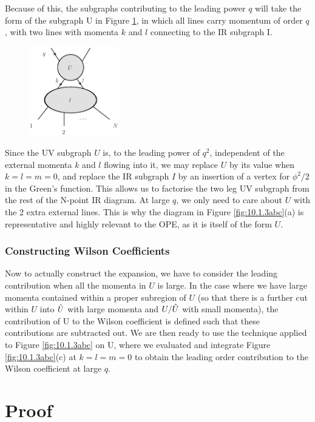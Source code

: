 \documentclass{article}
\begin{document}
Because of this, the subgraphs contributing to the leading power $q$ will take the form of the subgraph U in Figure \ref{fig:10.2.1}, in which all lines carry momentum of order $q$, with two lines with momenta $k$ and $l$ connecting to the IR subgraph I. 

\begin{figure}[H]
\centering
\includegraphics[width=0.35\textwidth]{Graphs/fig1021.eps} 
\caption{}
\label{fig:10.2.1}
\end{figure}

Since the UV subgraph $U$ is, to the leading power of $q^2$, independent of the external momenta $k$ and $l$ flowing into it, we may replace $U$ by its value when $k=l=m=0$, and replace the IR subgraph $I$ by an insertion of a vertex for $\phi^2/2$ in the Green's function. This allows us to factorise the two leg UV subgraph from the rest of the N-point IR diagram. At large $q$, we only need to care about $U$ with the 2 extra external lines. This is why the diagram in Figure \ref{fig:10.1.3abc}(a) is representative and highly relevant to the OPE, as it is itself of the form $U$.

\subsubsection{Constructing Wilson Coefficients}
Now to actually construct the expansion, we have to consider the leading contribution when all the momenta in $U$ is large. In the case where we have large momenta contained within a proper subregion of $U$ (so that there is a further cut within $U$ into $\Hat{U}$ with large momenta and $U/\Hat{U}$ with small momenta), the contribution of U to the Wilson coefficient is defined such that these contributions are subtracted out. We are then ready to use the technique applied to Figure \ref{fig:10.1.3abc} on U, where we evaluated and integrate Figure \ref{fig:10.1.3abc}(c) at $k=l=m=0$ to obtain the leading order contribution to the Wilson coefficient at large $q$. 

\section{Proof} \label{proof}
\end{document}
